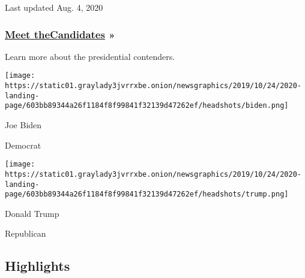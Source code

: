 Last updated Aug. 4, 2020

\hypertarget{meet-thecandidates-}{%
\subsubsection{\texorpdfstring{\href{https://www.nytimes3xbfgragh.onion/interactive/2019/us/politics/2020-presidential-candidates.html}{Meet
the}\href{https://www.nytimes3xbfgragh.onion/interactive/2019/us/politics/2020-presidential-candidates.html}{C}\href{https://www.nytimes3xbfgragh.onion/interactive/2019/us/politics/2020-presidential-candidates.html}{andidates}
»}{Meet theCandidates »}}\label{meet-thecandidates-}}

Learn more about the presidential contenders.

\href{https://www.nytimes3xbfgragh.onion/interactive/2020/us/elections/joe-biden.html}{}

\texttt{[image: https://static01.graylady3jvrrxbe.onion/newsgraphics/2019/10/24/2020-landing-page/603bb89344a26f1184f8f99841f32139d47262ef/headshots/biden.png]}

Joe Biden

Democrat

\href{https://www.nytimes3xbfgragh.onion/interactive/2020/us/elections/donald-trump.html}{}

\texttt{[image: https://static01.graylady3jvrrxbe.onion/newsgraphics/2019/10/24/2020-landing-page/603bb89344a26f1184f8f99841f32139d47262ef/headshots/trump.png]}

Donald Trump

Republican

\hypertarget{highlights}{%
\subsection{Highlights}\label{highlights}}

